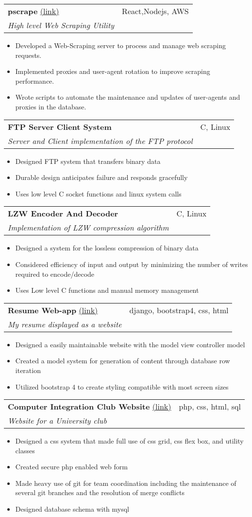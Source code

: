 \documentclass[letterpaper,11pt]{article}
\makeatletter
\newcommand{\resumeItem}[2]{
  \item\small{
    \textbf{#1}{ #2 \vspace{-2pt}}
  }
}
\newcommand{\resumeSubheading}[5]{
  \vspace{-1pt}\item
    \begin{tabular*}{0.97\textwidth}[t]{l@{\extracolsep{\fill}}r}
      \textbf{#1} #2 & #3 \\
      \textit{\small#4} & \textit{\small #5} \\
    \end{tabular*}\vspace{-5pt}
}
\newcommand{\resumeSubItem}[2]{\resumeItem{#1}{#2}\vspace{-4pt}}
\newcommand{\resumeItemListStart}{\begin{itemize}[leftmargin=*]}
\newcommand{\resumeItemListEnd}{\end{itemize}\vspace{-5pt}}
\makeatother
\begin{document}
  \resumeSubheading{pscrape}{\href{https://github.com/munikeraragon/p_scrape}{(link)}}{React,Nodejs, AWS}{High level Web Scraping Utility}{}
    \resumeItemListStart
      \resumeSubItem{}{Developed a Web-Scraping server to process and manage web scraping requests.}
      \resumeSubItem{}{Implemented proxies and user-agent rotation to improve scraping performance.}
      \resumeSubItem{}{Wrote scripts to automate the maintenance and updates of user-agents and proxies in the database.}
    \resumeItemListEnd
  
  \resumeSubheading{FTP Server Client System}{}{C, Linux}{Server and Client implementation of the FTP protocol}{}
    \resumeItemListStart
      \resumeSubItem{}{Designed FTP system that transfers binary data}
      \resumeSubItem{}{Durable design anticipates failure and responds gracefully}
      \resumeSubItem{}{Uses low level C socket functions and linux system calls}
    \resumeItemListEnd

  \resumeSubheading{LZW Encoder And Decoder}{}{C, Linux}{Implementation of LZW compression algorithm}{}
    \resumeItemListStart
      \resumeSubItem{}{Designed a system for the lossless compression of binary data}
      \resumeSubItem{}{Considered efficiency of input and output by minimizing the number of writes required to encode/decode}
      \resumeSubItem{}{Uses Low level C functions and manual memory management}
    \resumeItemListEnd
                                      
  \resumeSubheading{Resume Web-app}{\href{http://www.treverhibbs.com/}{(link)}}{django, bootstrap4, css, html}{My resume displayed as a website}{}
    \resumeItemListStart
      \resumeSubItem{}{Designed a easily maintainable website with the model view controller model}
      \resumeSubItem{}{Created a model system for generation of content through database row iteration}
      \resumeSubItem{}{Utilized bootstrap 4 to create styling compatible with most screen sizes}
    \resumeItemListEnd

  \resumeSubheading{Computer Integration Club Website}{\href{http://www6.encs.vancouver.wsu.edu/}{(link)}}{php, css, html, sql}{Website for a University club}{}
    \resumeItemListStart
      \resumeSubItem{}{Designed a css system that made full use of css grid, css flex box, and utility classes}
      \resumeSubItem{}{Created secure php enabled web form}
      \resumeSubItem{}{Made heavy use of git for team coordination including the maintenance of several git branches and the resolution of merge conflicts}
      \resumeSubItem{}{Designed database schema with mysql}
    \resumeItemListEnd
\end{document}
